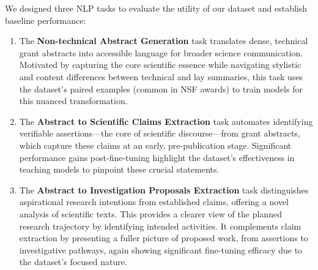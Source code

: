 \documentclass[11pt]{article}
\begin{document}
We designed three NLP tasks to evaluate the utility of our dataset and establish baseline performance:

\begin{enumerate}[noitemsep, wide, labelwidth=!, labelindent=0pt]
\item The \textbf{Non-technical Abstract Generation} task translates dense, technical grant abstracts into accessible language for broader science communication. Motivated by capturing the core scientific essence while navigating stylistic and content differences between technical and lay summaries, this task uses the dataset's paired examples (common in NSF awards) to train models for this nuanced transformation.
\item The \textbf{Abstract to Scientific Claims Extraction} task automates identifying verifiable assertions—the core of scientific discourse—from grant abstracts, which capture these claims at an early, pre-publication stage. Significant performance gains post-fine-tuning highlight the dataset's effectiveness in teaching models to pinpoint these crucial statements.
\item The \textbf{Abstract to Investigation Proposals Extraction} task distinguishes aspirational research intentions from established claims, offering a novel analysis of scientific texts. This provides a clearer view of the planned research trajectory by identifying intended activities. It complements claim extraction by presenting a fuller picture of proposed work, from assertions to investigative pathways, again showing significant fine-tuning efficacy due to the dataset's focused nature.
\end{enumerate}
\end{document}
